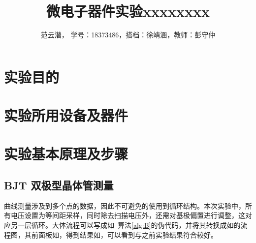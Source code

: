 \documentclass[lang=cn,11pt,a4paper,cite=authoryear]{elegantpaper}
\title{微电子器件实验\quad xxxxxxxx}
\author{范云潜， 学号：18373486，搭档：徐靖涵，教师：彭守仲}
\institute{微电子学院 184111 班}
\date{\zhtoday}
\begin{document}
\maketitle


\section{实验目的}

\section{实验所用设备及器件}

\section{实验基本原理及步骤}


\subsection{BJT 双极型晶体管测量}

曲线测量涉及到多个点的数据，因此不可避免的使用到循环结构。本次实验中，所有电压设置为等间距采样，同时除去扫描电压外，还需对基极偏置进行调整，这对应另一层循环。大体流程可以写成如~算法\ref{alg:B}的伪代码，并将其转换成如的流程图，其前面板如，得到结果如，可以看到与之前实验结果符合较好。



\end{document}
